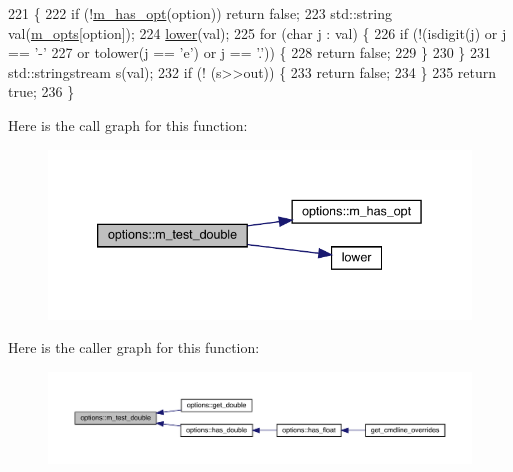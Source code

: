\begin{DoxyCode}
221 \{
222   \textcolor{keywordflow}{if} (!\hyperlink{classoptions_a99183ba43c8d7b35dbfa1bea0f43db48}{m\_has\_opt}(option)) \textcolor{keywordflow}{return} \textcolor{keyword}{false};
223   std::string val(\hyperlink{classoptions_ac73507ca925d98ee5ff6f04937dff5c3}{m\_opts}[option]);
224   \hyperlink{options_8cpp_a7a1c169fc6503243e8670fd2b30b06f1}{lower}(val);
225   \textcolor{keywordflow}{for} (\textcolor{keywordtype}{char} j : val) \{
226     \textcolor{keywordflow}{if} (!(isdigit(j) or j == \textcolor{charliteral}{'-'}
227              or tolower(j == \textcolor{charliteral}{'e'}) or j == \textcolor{charliteral}{'.'})) \{
228       \textcolor{keywordflow}{return} \textcolor{keyword}{false};
229     \}
230   \}
231   std::stringstream s(val);
232   \textcolor{keywordflow}{if} (! (s>>out)) \{
233     \textcolor{keywordflow}{return} \textcolor{keyword}{false};
234   \}
235   \textcolor{keywordflow}{return} \textcolor{keyword}{true};
236 \}
\end{DoxyCode}
Here is the call graph for this function\+:\nopagebreak
\begin{figure}[H]
\begin{center}
\leavevmode
\includegraphics[width=339pt]{classoptions_a0eebdb8dbce454720ef9251fcd7abf24_cgraph}
\end{center}
\end{figure}
Here is the caller graph for this function\+:\nopagebreak
\begin{figure}[H]
\begin{center}
\leavevmode
\includegraphics[width=350pt]{classoptions_a0eebdb8dbce454720ef9251fcd7abf24_icgraph}
\end{center}
\end{figure}
\mbox{\label{classoptions_ad9b4461e633b73acc2fde7752ef60d41}} 
